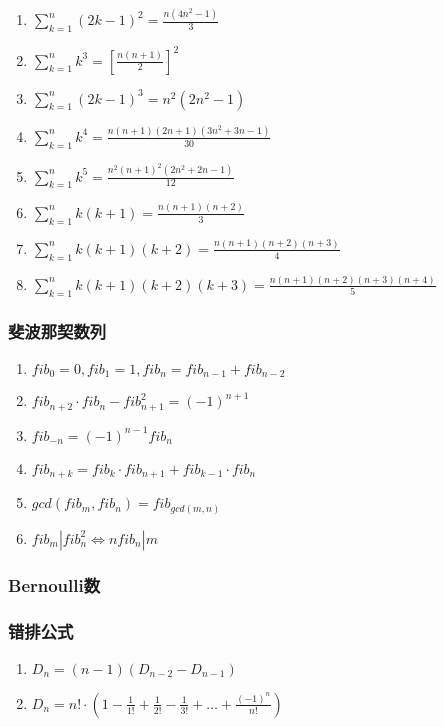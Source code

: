 \documentclass[a4paper]{ctexart}
\begin{document}
\begin{enumerate}
	\item $\sum_{k=1}^{n}(2k-1)^2 = \frac{n(4n^2-1)}{3}	$
	\item $\sum_{k=1}^{n}k^3 = [\frac{n(n+1)}{2}]^2	$
	\item $\sum_{k=1}^{n}(2k-1)^3 = n^2(2n^2-1)	$
	\item $\sum_{k=1}^{n}k^4 = \frac{n(n+1)(2n+1)(3n^2+3n-1)}{30}  $
	\item $\sum_{k=1}^{n}k^5 = \frac{n^2(n+1)^2(2n^2+2n-1)}{12}	$
	\item $\sum_{k=1}^{n}k(k+1) = \frac{n(n+1)(n+2)}{3}	$
	\item $\sum_{k=1}^{n}k(k+1)(k+2) = \frac{n(n+1)(n+2)(n+3)}{4} $
	\item $\sum_{k=1}^{n}k(k+1)(k+2)(k+3) = \frac{n(n+1)(n+2)(n+3)(n+4)}{5} $
\end{enumerate}

\subsubsection{斐波那契数列}

\begin{enumerate}
	\item $fib_0=0, fib_1=1, fib_n=fib_{n-1}+fib_{n-2}$
	\item $fib_{n+2} \cdot fib_n-fib_{n+1}^2=(-1)^{n+1}$
	\item $fib_{-n}=(-1)^{n-1}fib_n$
	\item $fib_{n+k}=fib_k \cdot fib_{n+1}+fib_{k-1} \cdot fib_n$
	\item $gcd(fib_m, fib_n)=fib_{gcd(m, n)}$
	\item $fib_m|fib_n^2\Leftrightarrow nfib_n|m$
\end{enumerate}

\subsubsection{Bernoulli数}


\subsubsection{错排公式}

\begin{enumerate}
	\item $D_n = (n-1)(D_{n-2}-D_{n-1})$
	\item $D_n = n! \cdot (1-\frac{1}{1!}+\frac{1}{2!}-\frac{1}{3!}+\ldots+\frac{(-1)^n}{n!})$
\end{enumerate}
\end{document}
